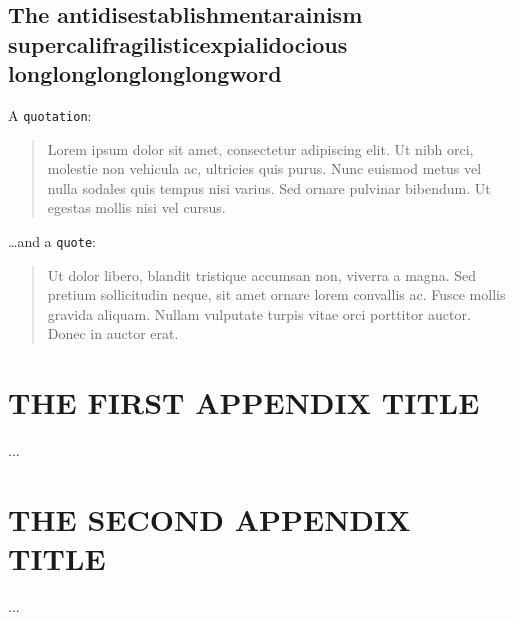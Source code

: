 \documentclass[proposal]{umassthesis}          %
\begin{document}
\section{The antidisestablishmentarainism supercalifragilisticexpialidocious longlonglonglonglongword}

A \texttt{quotation}:

\begin{quotation}
Lorem ipsum dolor sit amet, consectetur adipiscing elit. Ut nibh orci, molestie
non vehicula ac, ultricies quis purus. Nunc euismod metus vel nulla sodales quis
tempus nisi varius. Sed ornare pulvinar bibendum. Ut egestas mollis nisi vel
cursus.
\end{quotation}

\dots and a \texttt{quote}:

\begin{quote}
Ut dolor libero, blandit tristique accumsan non, viverra a magna. Sed pretium
sollicitudin neque, sit amet ornare lorem convallis ac. Fusce mollis gravida
aliquam. Nullam vulputate turpis vitae orci porttitor auctor. Donec in auctor
erat.
\end{quote}




\appendix
\chapter{THE FIRST APPENDIX TITLE}
...
\chapter{THE SECOND APPENDIX TITLE}
...

\backmatter  %




\end{document}
